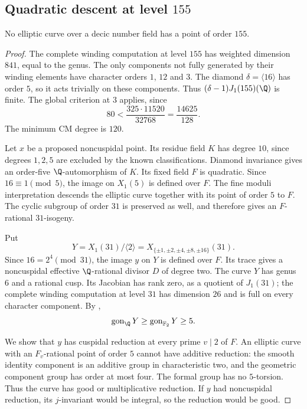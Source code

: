 \subsection{Quadratic descent at level \texorpdfstring{$155$}{155}}
\begin{proposition}\label{prop:decic155}
No elliptic curve over a decic number field has a point of order $155$.
\end{proposition}
\begin{proof}
The complete winding computation at level $155$ has weighted
dimension $841$, equal to the genus. The only components not
fully generated by their winding elements have character orders
$1$, $12$ and $3$. The diamond $\delta=\langle16\rangle$
has order $5$, so it acts trivially on these components.
Thus $(\delta-1)J_1(155)(\Q)$ is finite.
The global criterion at $3$ applies, since
\[
 80<\frac{325\cdot11520}{32768}=\frac{14625}{128}.
\]
The minimum CM degree is $120$.

Let $x$ be a proposed noncuspidal point. Its residue field $K$
has degree $10$, since degrees $1,2,5$ are excluded by the known
classifications. Diamond invariance gives an order-five
$\Q$-automorphism of $K$. Its fixed field $F$ is quadratic.
Since $16\equiv1\pmod5$, the image on $X_1(5)$ is defined over $F$.
The fine moduli interpretation descends the elliptic curve together
with its point of order $5$ to $F$. The cyclic subgroup of order $31$
is preserved as well, and therefore gives an $F$-rational $31$-isogeny.

Put
\[
 Y=X_1(31)/\langle2\rangle
   =X_{\{\pm1,\pm2,\pm4,\pm8,\pm16\}}(31).
\]
Since $16=2^4\pmod{31}$, the image $y$ on $Y$ is defined over $F$.
Its trace gives a noncuspidal effective $\Q$-rational divisor $D$
of degree two. The curve $Y$ has genus $6$ and a rational cusp.
Its Jacobian has rank zero, as a quotient of $J_1(31)$; the complete
winding computation at level $31$ has dimension $26$ and is full
on every character component. By \cite[Proposition~3.6]{Orlic},
\[
 \operatorname{gon}_{\Q}Y\geq
 \operatorname{gon}_{\mathbb F_2}Y\geq5.
\]

We show that $y$ has cuspidal reduction at every prime $v\mid2$
of $F$. An elliptic curve with an $F_v$-rational point of order $5$
cannot have additive reduction: the smooth identity component is
an additive group in characteristic two, and the geometric component
group has order at most four. The formal group has no $5$-torsion.
Thus the curve has good or multiplicative reduction.
If $y$ had noncuspidal reduction, its $j$-invariant would be integral,
so the reduction would be good.


\end{proof}
